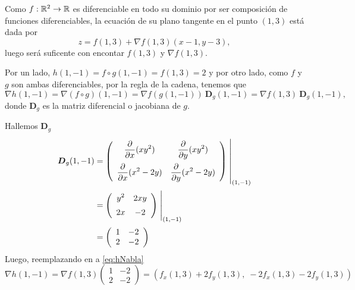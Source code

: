 \newpage
\begin{solution}

    Como   $f:\mathbb{R}^2\to\mathbb{R}$ es diferenciable en todo su dominio por ser composición de funciones diferenciables,  la ecuaci\'on de su plano tangente en el punto $(1,3)$ est\'a dada por
    \begin{equation}
        z= f(1,3) + \nabla f(1,3) (x-1,y-3),  \label{eq:zNabla}
    \end{equation}   luego ser\'a  suficente con encontar $ f(1,3)$ y $\nabla f(1,3).$

    Por un lado,      $h(1,-1)= f\circ g (1,-1) =  f(1,3)=2$  y por otro lado,  como $f$ y $g$ son ambas diferenciables,  por la regla de la cadena,  tenemos que
    \begin{equation}
        \nabla h(1,-1)=\nabla (f\circ g)(1,-1)=\nabla f(g(1,-1)) \:\boldsymbol{D}_g(1,-1) = \nabla f (1,3) \:\boldsymbol{D}_g(1,-1),  \label{eq:hNabla}
    \end{equation}    donde $\boldsymbol{D}_g$ es la matriz diferencial o  jacobiana de $g$.

    \noindent  Hallemos $\boldsymbol{D}_g$
    \begin{align*}
        \boldsymbol{D}_g(1,-1) & =
        \left(\begin{array}{cc}
                      \displaystyle\partialx (xy^2)            & \displaystyle\partialy (xy^2)           \\[10pt]
                      \displaystyle\partialx  (x^2 -2y) & \displaystyle\partialy (x^2 -2y)
                  \end{array}\right)\left.\rule{0pt}{1.1cm}\right\rvert_{(1,-1)}             \\[2pt]
                              & =\left(\begin{array}{cc}
                                               \displaystyle y^2                 & \displaystyle 2xy              \\[5pt]
                                               \displaystyle   2x & \displaystyle -2
                                           \end{array}\right)\left.\rule{0pt}{0.7cm}\right\rvert_{(1,-1)} \\[2pt]
                              & =\left(\begin{array}{cc}
                                               1    & -2    \\
                                               2 & -2
                                           \end{array}\right)
    \end{align*}
    Luego, reemplazando en  a   \eqref{eq:hNabla}
    \[
        \nabla h(1,-1) = \nabla f(1,3)\left(\begin{array}{cc}
                1   & -2    \\
                2 & -2
            \end{array}\right) = \left(f_x(1,3) + 2f_y(1,3),\;-2f_x(1,3)-2f_y(1,3)\right)
    \]


\end{solution}
